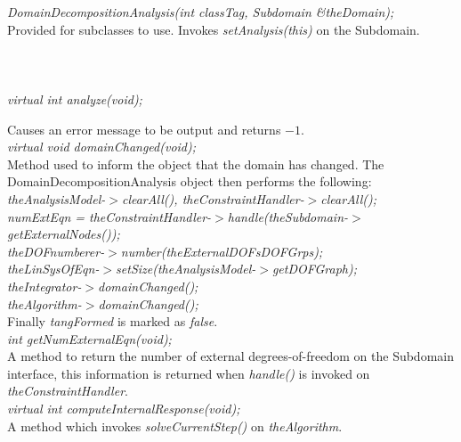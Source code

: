 {\em DomainDecompositionAnalysis(int classTag, Subdomain \&theDomain);}\\
Provided for subclasses to use. Invokes {\em setAnalysis(this)} on the
Subdomain. \\ 


 \\
\\ 

\\
{\em virtual int analyze(void);} 

Causes an error message to be output and returns $-1$. \\

{\em virtual void domainChanged(void);} \\
Method used to inform the object that the domain has changed. The
DomainDecompositionAnalysis object then performs the following: \\ {\em
\indent\indent theAnalysisModel-$>$clearAll(),
theConstraintHandler-$>$clearAll();\\ 
\indent\indent numExtEqn =
theConstraintHandler-$>$handle(theSubdomain-$>$getExternalNodes());\\ 
\indent\indent theDOFnumberer-$>$number(theExternalDOFsDOFGrps);  \\
\indent\indent theLinSysOfEqn-$>$setSize(theAnalysisModel-$>$getDOFGraph);  \\
\indent\indent theIntegrator-$>$domainChanged(); \\
\indent\indent theAlgorithm-$>$domainChanged(); \\ }
Finally {\em tangFormed} is marked as {\em false}. \\

{\em int getNumExternalEqn(void);} \\
A method to return the number of external degrees-of-freedom on the
Subdomain interface, this information is returned when {\em handle()}
is invoked on {\em theConstraintHandler}. \\

{\em     virtual int  computeInternalResponse(void);}\\
A method which invokes {\em solveCurrentStep()} on {\em theAlgorithm}.  \\

